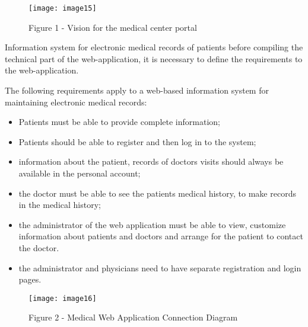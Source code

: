 \begin{figure}[H]
  \centering
  \texttt{[image: image15]}
  \caption*{Figure 1 - Vision for the medical center portal}
\end{figure}

\begin{multicols}{2}

Information system for electronic medical records of patients before
compiling the technical part of the web-application, it is necessary to
define the requirements to the web-application.

The following requirements apply to a web-based information system for
maintaining electronic medical records:

\begin{itemize}
\item
  Patients must be able to provide complete information;
\item
  Patients should be able to register and then log in to the system;
\item
  information about the patient, records of doctor\textquotesingle s
  visits should always be available in the personal account;
\item
  the doctor must be able to see the patient\textquotesingle s medical
  history, to make records in the medical history;
\item
  the administrator of the web application must be able to view,
  customize information about patients and doctors and arrange for the
  patient to contact the doctor.
\item
  the administrator and physicians need to have separate registration
  and login pages.
\end{itemize}

\end{multicols}

\begin{figure}[H]
  \centering
  \texttt{[image: image16]}
  \caption*{Figure 2 - Medical Web Application Connection Diagram}
\end{figure}

